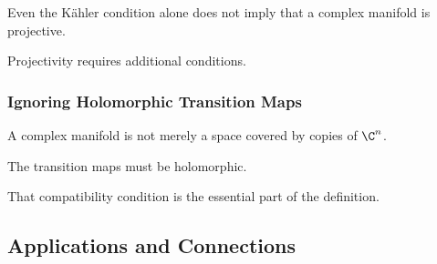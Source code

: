 Even the K\"ahler condition alone does not imply that a complex manifold is
projective.

Projectivity requires additional conditions.

\subsubsection{Ignoring Holomorphic Transition Maps}

A complex manifold is not merely a space covered by copies of \(\C^n\).

The transition maps must be holomorphic.

That compatibility condition is the essential part of the definition.

\subsection{Applications and Connections}
\label{subsec:complex-geometry-applications}

